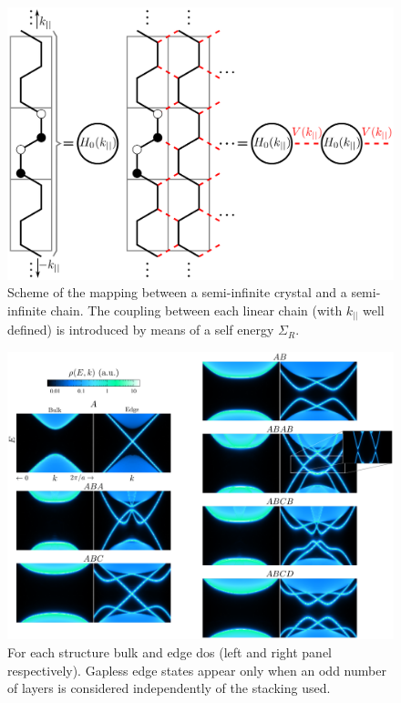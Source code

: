 \begin{figure}[hbt]
 \centering
  \includegraphics{appendix/fig_qsh/seminfinite.png}
\vspace{-5pt}
\caption{Scheme of the mapping between a semi-infinite crystal and a semi-infinite chain. The coupling between each linear chain (with $k_{||}$ well defined) is introduced by means of a self energy $\Sigma_{R}$.}
\label{Mapping}
\end{figure}

\begin{figure}
\centering
\includegraphics[width=\textwidth]{appendix/fig_qsh/dyson.png}
\caption{For each structure bulk and edge \ac{dos} (left and right panel respectively).
Gapless edge states appear only when an odd number of layers is considered independently of the stacking used.}
\label{DOSdyson}
\end{figure}


